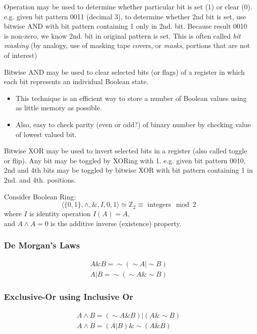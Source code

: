 \documentclass[10pt]{amsart}
\begin{document}
\begin{multicols*}{2}
Operation may be used to determine whether particular bit is set (1) or clear (0). e.g. given bit pattern 0011 (decimal 3), to determine whether 2nd bit is set, use bitwise AND with bit pattern containing 1 only in 2nd. bit. Because result 0010 is non-zero, we know 2nd. bit in original pattern is set. This is often called \emph{bit masking} (by analogy, use of masking tape covers, or \emph{masks}, portions that are not of interest)

Bitwise AND may be used to clear selected bits (or flags) of a register in which each bit represents an individual Boolean state.
\begin{itemize}
	\item This technique is an efficient way to store a number of Boolean values using as little memory as possible.
	\item Also, easy to check parity (even or odd?) of binary number by checking value of lowest valued bit.
\end{itemize}

Bitwise XOR may be used to invert selected bits in a register (also called toggle or flip). Any bit may be toggled by XORing with 1. e.g. given bit pattern 0010, 2nd and 4th bits may be toggled by bitwise XOR with bit pattern containing 1 in 2nd. and 4th. positions.



Consider Boolean Ring:
\[
\langle \lbrace 0 , 1 \rbrace, \wedge, \&, I, 0 , 1 \rangle \simeq \mathbb{Z}_2 \equiv  \text{ integers} \mod{2} 
\]
where $I$ is identity operation $I(A) = A$, \\
and 
$A\wedge A = 0$ is the additive inverse (existence) property.

\subsubsection{De Morgan's Laws}

\[
\begin{gathered}
A \& B = \sim (\sim A | \sim B) \\
A | B = \sim (\sim A \& \sim B)
\end{gathered}
\]

\subsubsection{Exclusive-Or using Inclusive Or}

\[
\begin{gathered} 
	A \wedge B = (\sim A \& B) | (A \& \sim B) \\
 A \wedge B = (A | B) \& \sim (A \& B)
\end{gathered} 
\]


\end{multicols*}
\end{document}
